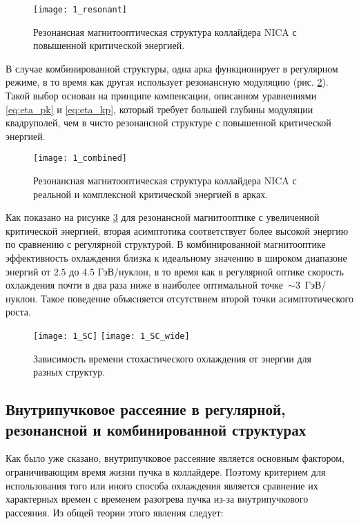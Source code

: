 \begin{figure}[!h]
  \centering
   \texttt{[image: 1\_resonant]}
   \caption{Резонансная магнитооптическая структура коллайдера NICA с повышенной критической энергией.}
   \label{fig:1_resonant}
\end{figure}

\noindent В случае комбинированной структуры, одна арка функционирует в регулярном режиме, в то время как другая использует резонансную модуляцию (рис. \ref{fig:1_combined}). Такой выбор основан на принципе компенсации, описанном уравнениями \ref{eq:eta_pk} и \ref{eq:eta_kp}, который требует большей глубины модуляции квадруполей, чем в чисто резонансной структуре с повышенной критической энергией.

\begin{figure}[!h]
  \centering
   \texttt{[image: 1\_combined]}
   \caption{Резонансная магнитооптическая структура коллайдера NICA с реальной и комплексной критической энергией в арках.}
   \label{fig:1_combined}
\end{figure}

\noindent Как показано на рисунке \ref{fig:1_SC} для резонансной магнитооптике с увеличенной критической энергией, вторая асимптотика соответствует более высокой энергию по сравнению с регулярной структурой. В комбинированной магнитооптике эффективность охлаждения близка к идеальному значению в широком диапазоне энергий от $2.5$ до $4.5$ ГэВ/нуклон, в то время как в регулярной оптике скорость охлаждения почти в два раза ниже в наиболее оптимальной точке~$\sim3$~ГэВ/нуклон. Такое поведение объясняется отсутствием второй точки асимптотического роста.

\begin{figure}[!h]
  \centering
   \texttt{[image: 1\_SC]}
   \texttt{[image: 1\_SC\_wide]}
   \caption{Зависимость времени стохастического охлаждения от энергии для разных структур.}
   \label{fig:1_SC}
\end{figure}

\newpage
\subsection{Внутрипучковое рассеяние в регулярной, резонансной и комбинированной структурах}\label{sec:ions_light/IBS_res_reg}

\par Как было уже сказано, внутрипучковое рассеяние является основным фактором, ограничивающим время жизни пучка в коллайдере. Поэтому критерием для использования того или иного способа охлаждения является сравнение их характерных времен с временем разогрева пучка из-за внутрипучкового рассеяния. Из общей теории этого явления следует:

